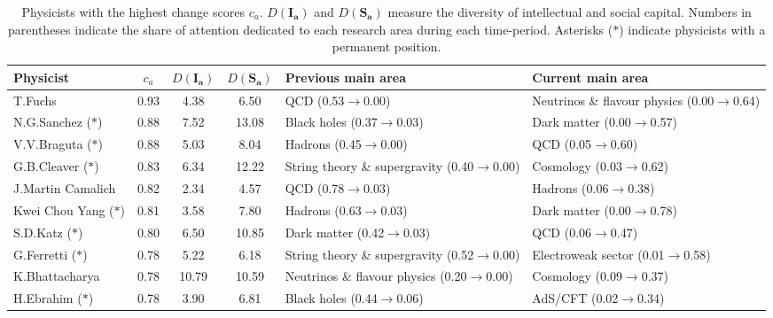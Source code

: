 \begin{table}
\centering
\caption{Physicists with the highest change scores $c_a$. $D(\bm{I_a})$ and $D(\bm{S_a})$ measure the diversity of intellectual and social capital. Numbers in parentheses indicate the share of attention dedicated to each research area during each time-period. Asterisks ($\ast$) indicate physicists with a permanent position.}
\label{table:top_change}
\begin{tabular}{p{}|c|c|c|b{}|b{}}
\toprule
              Physicist & $c_a$ & $D(\bm{I_a})$ & $D(\bm{S_a})$ &                            Previous main area &                               Current main area \\
\midrule
                T.Fuchs &  0.93 &          4.38 &          6.50 &                           QCD (0.53$\to$0.00) & Neutrinos \& flavour physics (0.00$\to$0.64)\\ \hline
   N.G.Sanchez ($\ast$) &  0.88 &          7.52 &         13.08 &                   Black holes (0.37$\to$0.03) &                  Dark matter (0.00$\to$0.57)\\ \hline
   V.V.Braguta ($\ast$) &  0.88 &          5.03 &          8.04 &                       Hadrons (0.45$\to$0.00) &                          QCD (0.05$\to$0.60)\\ \hline
   G.B.Cleaver ($\ast$) &  0.83 &          6.34 &         12.22 & String theory \& supergravity (0.40$\to$0.00) &                    Cosmology (0.03$\to$0.62)\\ \hline
      J.Martin Camalich &  0.82 &          2.34 &          4.57 &                           QCD (0.78$\to$0.03) &                      Hadrons (0.06$\to$0.38)\\ \hline
Kwei Chou Yang ($\ast$) &  0.81 &          3.58 &          7.80 &                       Hadrons (0.63$\to$0.03) &                  Dark matter (0.00$\to$0.78)\\ \hline
      S.D.Katz ($\ast$) &  0.80 &          6.50 &         10.85 &                   Dark matter (0.42$\to$0.03) &                          QCD (0.06$\to$0.47)\\ \hline
    G.Ferretti ($\ast$) &  0.78 &          5.22 &          6.18 & String theory \& supergravity (0.52$\to$0.00) &           Electroweak sector (0.01$\to$0.58)\\ \hline
         K.Bhattacharya &  0.78 &         10.79 &         10.59 &  Neutrinos \& flavour physics (0.20$\to$0.00) &                    Cosmology (0.09$\to$0.37)\\ \hline
     H.Ebrahim ($\ast$) &  0.78 &          3.90 &          6.81 &                   Black holes (0.44$\to$0.06) &                      AdS/CFT (0.02$\to$0.34)\\ \hline
\bottomrule
\end{tabular}
\end{table}

